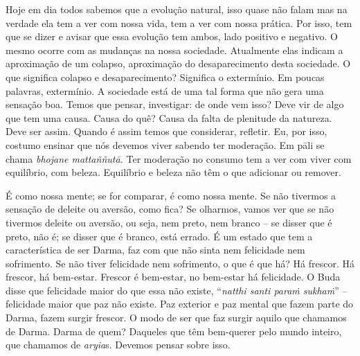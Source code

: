 Hoje em dia todos sabemos que a evolução natural, isso quase não
falam mas na verdade ela tem a ver com nossa vida, tem a ver com nossa
prática. Por isso, tem que se dizer e avisar que essa evolução tem
ambos, lado positivo e negativo. O mesmo ocorre com as mudanças na
nossa sociedade. Atualmente elas indicam a aproximação de um colapso,
aproximação do desaparecimento desta sociedade. O que significa colapso
e desaparecimento? Significa o extermínio. Em poucas palavras,
extermínio. A sociedade está de uma tal forma que não gera uma sensação
boa. Temos que pensar, investigar: de onde vem isso? Deve vir de algo
que tem uma causa. Causa do quê? Causa da falta de plenitude da
natureza. Deve ser assim. Quando é assim temos que considerar,
refletir. Eu, por isso, costumo ensinar que nós devemos viver sabendo
ter moderação. Em pāli se chama \textit{bhojane mattaññutā.} Ter
moderação no consumo tem a ver com viver com equilíbrio, com beleza.
Equilíbrio e beleza não têm o que adicionar ou remover. 

É como nossa mente; se for comparar, é como nossa mente. Se não
tivermos a sensação de deleite ou aversão, como fica? Se olharmos,
vamos ver que se não tivermos deleite ou aversão, ou seja, nem preto,
nem branco – se disser que é preto, não é; se disser que é branco, está
errado. É um estado que tem a característica de ser Darma, faz com que
não sinta nem felicidade nem sofrimento. Se não tiver felicidade nem
sofrimento, o que é que há? Há frescor. Há frescor, há bem-estar.
Frescor é bem-estar, no bem-estar há felicidade. O Buda disse que
felicidade maior do que essa não existe, “\textit{natthi santi paraṁ
sukhaṁ}” – felicidade maior que paz não existe. Paz exterior e
paz mental que fazem parte do Darma, fazem surgir frescor. O modo de
ser que faz surgir aquilo que chamamos de Darma. Darma de quem?
Daqueles que têm bem-querer pelo mundo inteiro, que chamamos de
\textit{aryia}s. Devemos pensar sobre isso. 

